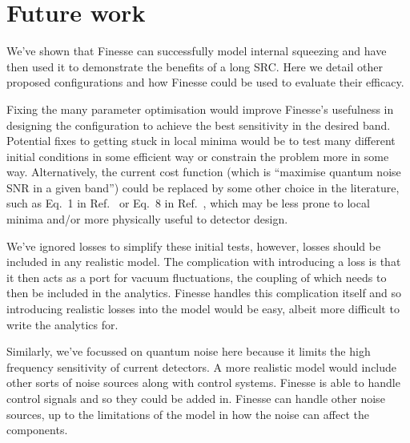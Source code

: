 \documentclass[aps,pra,superscriptaddress,reprint,nofootinbib]{revtex4-1}
\begin{document}
\section{Future work}
\label{sec:future_work}

We’ve shown that Finesse can successfully model internal squeezing and have then used it to demonstrate the benefits of a long SRC. Here we detail other proposed configurations and how Finesse could be used to evaluate their efficacy.


Fixing the many parameter optimisation would improve Finesse’s usefulness in designing the configuration to achieve the best sensitivity in the desired band. Potential fixes to getting stuck in local minima would be to test many different initial conditions in some efficient way or constrain the problem more in some way. Alternatively, the current cost function (which is “maximise quantum noise SNR in a given band”) could be replaced by some other choice in the literature, such as Eq.~1 in Ref.~\cite{Miao_2014} or Eq.~8 in Ref.~\cite{Martynov_2019}, which may be less prone to local minima and/or more physically useful to detector design.


We’ve ignored losses to simplify these initial tests, however, losses should be included in any realistic model. The complication with introducing a loss is that it then acts as a port for vacuum fluctuations, the coupling of which needs to then be included in the analytics. Finesse handles this complication itself and so introducing realistic losses into the model would be easy, albeit more difficult to write the analytics for.


Similarly, we’ve focussed on quantum noise here because it limits the high frequency sensitivity of current detectors. A more realistic model would include other sorts of noise sources along with control systems. Finesse is able to handle control signals and so they could be added in. Finesse can handle other noise sources, up to the limitations of the model in how the noise can affect the components.
\end{document}
